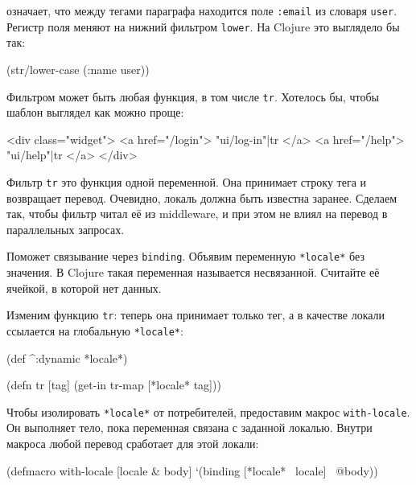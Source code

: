 \noindent
означает, что между тегами параграфа находится поле \verb|:email| из словаря
\verb|user|. Регистр поля меняют на нижний фильтром \verb|lower|. На Clojure
это выглядело бы так:

\begin{english}
  \begin{clojure}
(str/lower-case (:name user))
  \end{clojure}
\end{english}

Фильтром может быть любая функция, в том числе \verb|tr|. Хотелось бы,
чтобы шаблон выглядел как можно проще:

\begin{english}
  \begin{htmldjango}
<div class="widget">
  <a href="/login">{{ "ui/log-in"|tr }}</a>
  <a href="/help">{{ "ui/help"|tr }}</a>
</div>
  \end{htmldjango}
\end{english}

Фильтр \verb|tr| это функция одной переменной. Она принимает строку тега и
возвращает перевод. Очевидно, локаль должна быть известна заранее. Сделаем так,
чтобы фильтр читал её из middleware, и при этом не влиял на перевод в параллельных
запросах.

Поможет связывание через \verb|binding|. Объявим переменную \verb|*locale*| без
значения. В Clojure такая переменная называется несвязанной. Считайте её
ячейкой, в которой нет данных.

Изменим функцию \verb|tr|: теперь она принимает только тег, а в качестве
локали ссылается на глобальную \verb|*locale*|:

\begin{english}
  \begin{clojure}
(def ^:dynamic *locale*)

(defn tr [tag]
  (get-in tr-map [*locale* tag]))
  \end{clojure}
\end{english}


Чтобы изолировать \verb|*locale*| от потребителей, предоставим макрос
\verb|with-locale|. Он выполняет тело, пока переменная связана с заданной
локалью. Внутри макроса любой перевод сработает для этой локали:

\begin{english}
  \begin{clojure}
(defmacro with-locale
  [locale & body]
  `(binding [*locale* ~locale]
     ~@body))
  \end{clojure}
\end{english}

